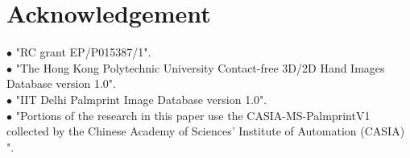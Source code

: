 \documentclass[review]{elsarticle}
\begin{document}
\section*{Acknowledgement}
	$\bullet$ "RC grant EP/P015387/1".\\
	$\bullet$ "The Hong Kong Polytechnic University  Contact-free 3D/2D Hand Images Database version 1.0". \\
	$\bullet$ "IIT Delhi Palmprint Image Database version 1.0".\\
	$\bullet$ "Portions of the research in this paper use the CASIA-MS-PalmprintV1 collected by the Chinese Academy of Sciences' Institute of Automation (CASIA) ".



\end{document}
